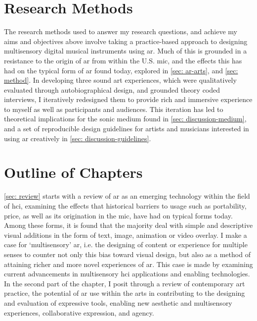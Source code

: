 \section{Research Methods}\label{sec: introduction-methods}
The research methods used to answer my research questions, and achieve my aims and objectives above involve taking a practice-based approach to designing multisensory digital musical instruments using \gls{ar}. Much of this is grounded in a resistance to the origin of \gls{ar} from within the U.S. \gls{mic}, and the effects this has had on the typical form of \gls{ar} found today, explored in \autoref{sec: ar-arts}, and \autoref{sec: method}. In developing three sound \gls{art} experiences, which were qualitatively evaluated through autobiographical design, and grounded theory coded interviews, I iteratively redesigned them to provide rich and immersive experience to myself as well as participants and audiences. This iteration has led to theoretical implications for the sonic medium found in \autoref{sec: discussion-medium}, and a set of reproducible design guidelines for artists and musicians interested in using \gls{ar} creatively in \autoref{sec: discussion-guidelines}.




\section{Outline of Chapters}\label{sec: introduction-outline}
\autoref{sec: review} starts with a review of \gls{ar} as an emerging technology within the field of \gls{hci}, examining the effects that historical barriers to usage such as portability, price, as well as its origination in the \gls{mic}, have had on typical forms today. Among these forms, it is found that the majority deal with simple and descriptive visual additions in the form of text, image, animation or video overlay. I make a case for `multisensory' \gls{ar}, i.e. the designing of content or experience for multiple senses to counter not only this bias toward visual design, but also as a method of attaining richer and more novel experiences of \gls{ar}. This case is made by examining current advancements in multisensory \gls{hci} applications and enabling technologies. In the second part of the chapter, I posit through a review of contemporary art practice, the potential of \gls{ar} use within the arts in contributing to the designing and evaluation of expressive tools, enabling new aesthetic and multisensory experiences, collaborative expression, and agency.

